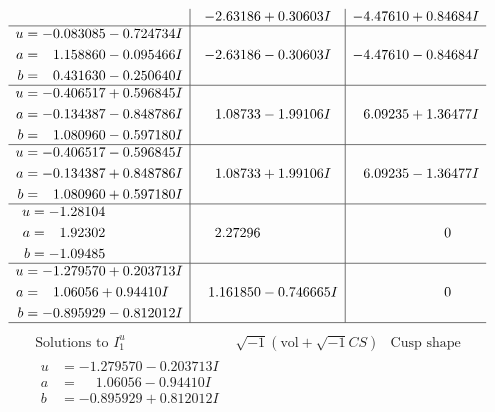 \documentclass[1p]{elsarticle_modified}
\theoremstyle{definition}
\newcommand{\I}{\sqrt{-1}}
\begin{document}
$$\begin{array}{c|c|c}
 & -2.63186 + 0.30603 I & -4.47610 + 0.84684 I \\ \hline\begin{aligned}
u &= -0.083085 - 0.724734 I \\
a &= \phantom{-}1.158860 - 0.095466 I \\
b &= \phantom{-}0.431630 - 0.250640 I\end{aligned}
 & -2.63186 - 0.30603 I & -4.47610 - 0.84684 I \\ \hline\begin{aligned}
u &= -0.406517 + 0.596845 I \\
a &= -0.134387 - 0.848786 I \\
b &= \phantom{-}1.080960 - 0.597180 I\end{aligned}
 & \phantom{-}1.08733 - 1.99106 I & \phantom{-}6.09235 + 1.36477 I \\ \hline\begin{aligned}
u &= -0.406517 - 0.596845 I \\
a &= -0.134387 + 0.848786 I \\
b &= \phantom{-}1.080960 + 0.597180 I\end{aligned}
 & \phantom{-}1.08733 + 1.99106 I & \phantom{-}6.09235 - 1.36477 I \\ \hline\begin{aligned}
u &= -1.28104\phantom{ +0.000000I} \\
a &= \phantom{-}1.92302\phantom{ +0.000000I} \\
b &= -1.09485\phantom{ +0.000000I}\end{aligned}
 & \phantom{-}2.27296\phantom{ +0.000000I} & \phantom{-0.000000 } 0 \\ \hline\begin{aligned}
u &= -1.279570 + 0.203713 I \\
a &= \phantom{-}1.06056 + 0.94410 I \\
b &= -0.895929 - 0.812012 I\end{aligned}
 & \phantom{-}1.161850 - 0.746665 I & \phantom{-0.000000 } 0\\
 \hline 
 \end{array}$$\newpage$$\begin{array}{c|c|c}  
\text{Solutions to }I^u_{1}& \I (\text{vol} + \sqrt{-1}CS) & \text{Cusp shape}\\
 \hline 
\begin{aligned}
u &= -1.279570 - 0.203713 I \\
a &= \phantom{-}1.06056 - 0.94410 I \\
b &= -0.895929 + 0.812012 I\end{aligned}

\end{array}$$
\end{document}
